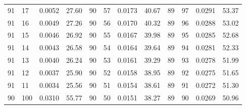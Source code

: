 \begin{tabular}{llll|llll|llll}
91 & 17 & 0.0052 & 27.60 & 90 & 57 & 0.0173 & 40.67 & 89 & 97 & 0.0291 & 53.37\\
91 & 16 & 0.0049 & 27.26 & 90 & 56 & 0.0170 & 40.32 & 89 & 96 & 0.0288 & 53.02\\
91 & 15 & 0.0046 & 26.92 & 90 & 55 & 0.0167 & 39.98 & 89 & 95 & 0.0285 & 52.68\\
91 & 14 & 0.0043 & 26.58 & 90 & 54 & 0.0164 & 39.64 & 89 & 94 & 0.0281 & 52.33\\
91 & 13 & 0.0040 & 26.24 & 90 & 53 & 0.0161 & 39.29 & 89 & 93 & 0.0278 & 51.99\\
91 & 12 & 0.0037 & 25.90 & 90 & 52 & 0.0158 & 38.95 & 89 & 92 & 0.0275 & 51.65\\
91 & 11 & 0.0034 & 25.56 & 90 & 51 & 0.0154 & 38.61 & 89 & 91 & 0.0272 & 51.30\\
90 & 100 & 0.0310 & 55.77 & 90 & 50 & 0.0151 & 38.27 & 89 & 90 & 0.0269 & 50.96\\
\bottomrule
\end{tabular}
\newpage

